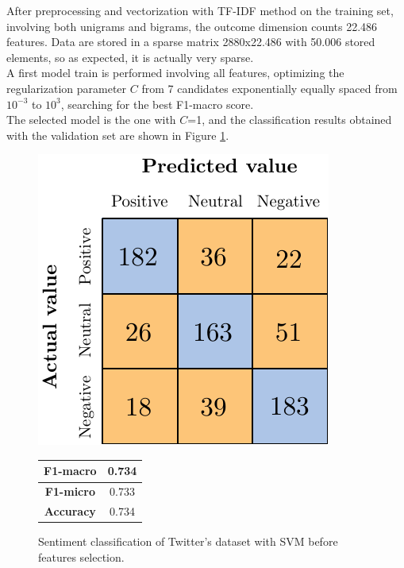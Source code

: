 After preprocessing and vectorization with TF-IDF method on the training set, involving both unigrams and bigrams, the outcome dimension counts 22.486 features. Data are stored in a sparse matrix 2880x22.486 with 50.006 stored elements, so as expected, it is actually very sparse.\\
A first model train is performed involving all features, optimizing the regularization parameter $C$ from 7 candidates exponentially equally spaced from $10^{-3}$ to $10^3$, searching for the best F1-macro score.\\
The selected model is the one with $C$=1, and the classification results obtained with the validation set are shown in Figure \ref{fig:twitter_snt_svm_bfs}.

\begin{figure}[H]
\begin{minipage}[b]{0.60\linewidth}
	\centering
	\includegraphics[scale=1]{figures/conf_matrices/twitter_snt_svm/twitter_snt_svm_bfs.pdf}
\end{minipage}
\begin{minipage}[b]{0.30\linewidth}
	\centering
		\begin{tabular}[b]{ | c | c | } 
		\hline
		\textbf{F1-macro} & 0.734 \\
		\hline
		\textbf{F1-micro} & 0.733 \\ 
		\hline
		\textbf{Accuracy} & 0.734 \\ 
		\hline
	\end{tabular}
\end{minipage}
\caption{Sentiment classification of Twitter's dataset with SVM before features selection.}
\label{fig:twitter_snt_svm_bfs}
\end{figure}



